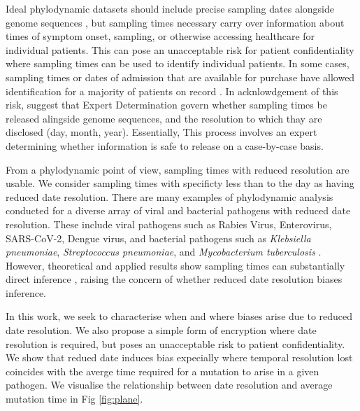 \documentclass{article}
\begin{document}
\begin{spacing}{1.5}
Ideal phylodynamic datasets should include precise sampling dates alongside genome sequences \citep{black2020ten}, but sampling times necessary carry over information about times of symptom onset, sampling, or otherwise accessing healthcare for individual patients. This can pose an unacceptable risk for patient confidentiality where sampling times can be used to identify individual patients. In some cases, sampling times or dates of admission that are available for purchase have allowed identification for a majority of patients on record \citep{sweeney_matching_2013,shean_private_2018}. In acknlowdgement of this risk, \citet{shean_private_2018} suggest that Expert Determination govern whether sampling times be released alingside genome sequences, and the resolution to which thay are disclosed (day, month, year). Essentially, This process involves an expert determining whether information is safe to release on a case-by-case basis.

From a phylodynamic point of view, sampling times with reduced resolution are usable. We consider sampling times with specificty less than to the day as having reduced date resolution. There are many examples of phylodynamic analysis conducted for a diverse array of viral and bacterial pathogens with reduced date resolution. These include viral pathogens such as Rabies Virus, Enterovirus, SARS-CoV-2, Dengue virus, and bacterial pathogens such as \textit{Klebsiella pneumoniae}, \textit{Streptococcus pneumoniae}, and \textit{Mycobacterium tuberculosis} \citep{talbi_phylodynamics_2010,xiao_genomic_2022,wolf_temporal_2022,bennett_epidemic_2010,cella_multi-drug_2017,azarian_impact_2018,merker_evolutionary_2015}. However, theoretical and applied results show sampling times can substantially direct inference \citep{featherstone_decoding_2023,featherstone_infectious_2021,volz_sampling_2014}, raising the concern of whether reduced date resolution biases inference.

In this work, we seek to characterise when and where biases arise due to reduced date resolution. We also propose a simple form of encryption where date resolution is required, but poses an unacceptable risk to patient confidentiality. We show that redued date induces bias expecially where temporal resolution lost coincides with the averge time required for a mutation to arise in a given pathogen. We visualise the relationship between date resolution and average mutation time in Fig \ref{fig:plane}.


\end{spacing}
\end{document}
